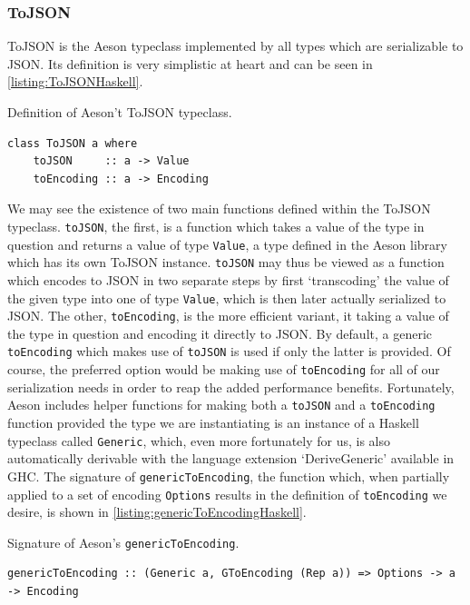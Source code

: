 \documentclass[11pt]{report}
\begin{document}
\subsubsection{ToJSON}

ToJSON is the Aeson typeclass implemented by all types which are serializable
to JSON. Its definition is very simplistic at heart and can be seen in
\autoref{listing:ToJSONHaskell}.

\begin{listing}[H]
\caption{Definition of Aeson't ToJSON typeclass.}
\label{listing:ToJSONHaskell}
\begin{verbatim}
class ToJSON a where
    toJSON     :: a -> Value
    toEncoding :: a -> Encoding
\end{verbatim}
\end{listing}

We may see the existence of two main functions defined within the ToJSON
typeclass. \texttt{toJSON}, the first, is a function which takes a value
of the type in question and returns a value of type \texttt{Value}, a type
defined in the Aeson library which has its own ToJSON instance.
\texttt{toJSON} may thus be viewed as a function which encodes to JSON in two
separate steps by first `transcoding' the value of the given type into one of
type \texttt{Value}, which is then later actually serialized to JSON\@.
The other, \texttt{toEncoding}, is the more efficient variant, it taking a
value of the type in question and encoding it directly to JSON\@. By default, a
generic \texttt{toEncoding} which makes use of \texttt{toJSON} is used if only
the latter is provided.  Of course, the preferred option would be making use
of \texttt{toEncoding} for all of our serialization needs in order to reap
the added performance benefits. \newline
Fortunately, Aeson includes helper functions for making both a \texttt{toJSON}
and a \texttt{toEncoding} function provided the type we are instantiating is an
instance of a Haskell typeclass called \texttt{Generic}, which, even more
fortunately for us, is also automatically derivable with the language
extension `DeriveGeneric' available in GHC\@. The signature of
\texttt{genericToEncoding}, the function which, when partially applied to a set
of encoding \texttt{Options} results in the definition of \texttt{toEncoding}
we desire, is shown in \autoref{listing:genericToEncodingHaskell}.

\begin{listing}[H]
\caption{Signature of Aeson's \texttt{genericToEncoding}.}
\label{listing:genericToEncodingHaskell}
\begin{verbatim}
genericToEncoding :: (Generic a, GToEncoding (Rep a)) => Options -> a -> Encoding
\end{verbatim}
\end{listing}
\end{document}
